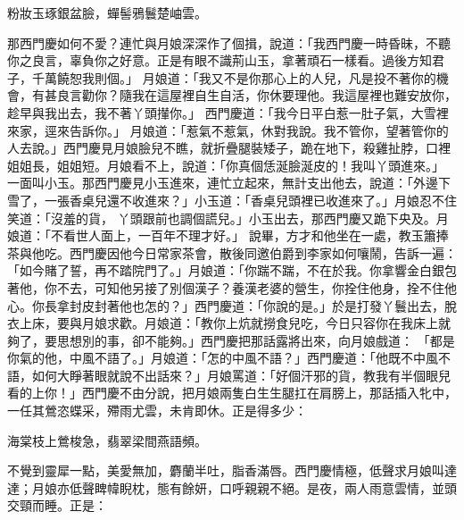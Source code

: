 \begin{showcontents}{}
粉妝玉琢銀盆臉，蟬髻鴉鬟楚岫雲。

那西門慶如何不愛？連忙與月娘深深作了個揖，說道：「我西門慶一時昏昧，不聽你之良言，辜負你之好意。正是有眼不識荊山玉，拿著頑石一樣看。過後方知君子，千萬饒恕我則個。」
月娘道：「我又不是你那心上的人兒，凡是投不著你的機會，有甚良言勸你？隨我在這屋裡自生自活，你休要理他。我這屋裡也難安放你，趁早與我出去，我不著丫頭攆你。」
西門慶道：「我今日平白惹一肚子氣，大雪裡來家，逕來告訴你。」
月娘道：「惹氣不惹氣，休對我說。我不管你，望著管你的人去說。」西門慶見月娘臉兒不瞧，就折疊腿裝矮子，跪在地下，殺雞扯脖，口裡姐姐長，姐姐短。月娘看不上，說道：「你真個恁涎臉涎皮的！我叫丫頭進來。」 一面叫小玉。那西門慶見小玉進來，連忙立起來，無計支出他去，說道：「外邊下雪了，一張香桌兒還不收進來？」小玉道：「香桌兒頭裡已收進來了。」月娘忍不住笑道：「沒羞的貨，
丫頭跟前也調個謊兒。」小玉出去，那西門慶又跪下央及。月娘道：「不看世人面上，一百年不理才好。」
說畢，方才和他坐在一處，教玉簫捧茶與他吃。西門慶因他今日常家茶會，散後同邀伯爵到李家如何嚷鬧，告訴一遍：「如今賭了誓，再不踏院門了。」月娘道：「你踹不踹，不在於我。你拿響金白銀包著他，你不去，可知他另接了別個漢子？養漢老婆的營生，你拴住他身，拴不住他心。你長拿封皮封著他也怎的？」西門慶道：「你說的是。」於是打發丫鬟出去，脫衣上床，要與月娘求歡。月娘道：「教你上炕就撈食兒吃，今日只容你在我床上就夠了，要思想別的事，卻不能夠。」西門慶把那話露將出來，向月娘戲道： 「都是你氣的他，中風不語了。」月娘道：「怎的中風不語？」西門慶道：「他既不中風不語，如何大睜著眼就說不出話來？」月娘罵道：「好個汗邪的貨，教我有半個眼兒看的上你！」西門慶不由分說，把月娘兩隻白生生腿扛在肩膀上，那話插入牝中，一任其鶯恣蝶采，殢雨尤雲，未肯即休。正是得多少：

海棠枝上鶯梭急，翡翠梁間燕語頻。

不覺到靈犀一點，美愛無加，麝蘭半吐，脂香滿唇。西門慶情極，低聲求月娘叫達達；月娘亦低聲睥幃睨枕，態有餘妍，口呼親親不絕。是夜，兩人雨意雲情，並頭交頸而睡。正是：


\end{showcontents}

